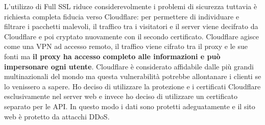 L'utilizzo di Full SSL riduce considerevolmente i problemi di sicurezza tuttavia \`e richiesta completa fiducia verso Cloudflare: per permettere di individuare e filtrare i pacchetti malevoli, il traffico tra i visitatori e il server viene decifrato da Cloudflare e poi cryptato nuovamente con il secondo certificato. Cloudflare agisce come una VPN ad accesso remoto, il traffico viene cifrato tra il proxy e le sue fonti ma \textbf{il proxy ha accesso completo alle informazioni e pu\`o impersonare ogni utente}. Cloudflare \`e considerato affidabile dalle pi\`u grandi multinazionali del mondo ma questa vulnerabilit\`a potrebbe allontanare i clienti se lo venissero a sapere. Ho deciso di utilizzare la protezione e i certificati Cloudflare esclusivamente nel server web e invece ho deciso di utilizzare un certificato separato per le API. In questo modo i dati sono protetti adeguatamente e il sito web \`e protetto da attacchi DDoS\@.
